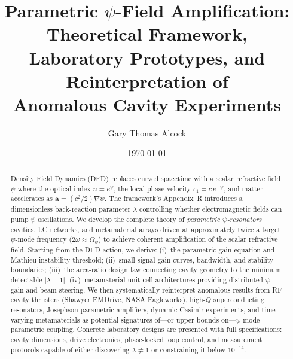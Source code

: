 \documentclass[12pt,aps,prd,twocolumn,superscriptaddress,nofootinbib]{revtex4-2}
\newcommand{\Opsi}{\Omega_\psi}
\begin{document}
\title{Parametric $\psi$-Field Amplification: Theoretical Framework,\\
Laboratory Prototypes, and Reinterpretation of\\
Anomalous Cavity Experiments}

\author{Gary Thomas Alcock}

\date{\today}

\begin{abstract}
Density Field Dynamics (DFD) replaces curved spacetime with a scalar
refractive field $\psi$ where the optical index $n = e^\psi$, the local
phase velocity $c_1 = c\,e^{-\psi}$, and matter accelerates as
$\mathbf{a} = (c^2/2)\nabla\psi$.  The framework's Appendix~R introduces
a dimensionless back-reaction parameter $\lambda$ controlling whether
electromagnetic fields can pump $\psi$ oscillations.  We develop the
complete theory of \emph{parametric $\psi$-resonators}---cavities, LC
networks, and metamaterial arrays driven at approximately twice a target
$\psi$-mode frequency ($2\omega \approx \Opsi$) to achieve coherent
amplification of the scalar refractive field.  Starting from the DFD
action, we derive: (i)~the parametric gain equation and Mathieu
instability threshold; (ii)~small-signal gain curves, bandwidth, and
stability boundaries; (iii)~the area-ratio design law connecting cavity
geometry to the minimum detectable $|\lambda - 1|$; (iv)~metamaterial
unit-cell architectures providing distributed $\psi$ gain and
beam-steering.  We then systematically reinterpret anomalous results
from RF cavity thrusters (Shawyer EMDrive, NASA Eagleworks), high-$Q$
superconducting resonators, Josephson parametric amplifiers, dynamic
Casimir experiments, and time-varying metamaterials as potential
signatures of---or upper bounds on---$\psi$-mode parametric coupling.
Concrete laboratory designs are presented with full specifications:
cavity dimensions, drive electronics, phase-locked loop control, and
measurement protocols capable of either discovering $\lambda \neq 1$ or
constraining it below $10^{-14}$.
\end{abstract}

\maketitle
\tableofcontents

\end{document}
